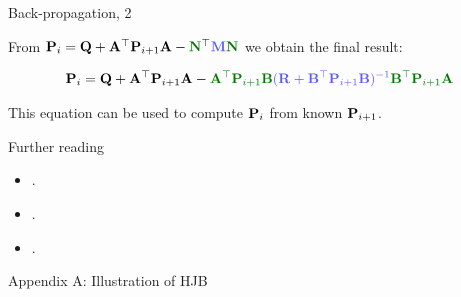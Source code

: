 \documentclass{beamer}
\begin{document}
\begin{frame}{Back-propagation, 2}
	\begin{flushleft}
		
		From $\bo{P}_i = 	\bo{Q} + \bo{A}\T \bo{P}_{i+1} \bo{A} - \textcolor{mydarkgreen}{\bo{N}}\T  \textcolor{myblue}{\bo{M}} \textcolor{mydarkgreen}{\bo{N}}  $ we obtain the final result:
		
		\begin{align*}
			\bo{P}_i = 	\bo{Q} + \bo{A}\T \bo{P}_{i+1} \bo{A} - 
			\textcolor{mydarkgreen}{\bo{A}\T\bo{P}_{i+1}\bo{B}}  \textcolor{myblue}{(\bo{R} + \bo{B}\T \bo{P}_{i+1} \bo{B})^{-1} } \textcolor{mydarkgreen}{\bo{B}\T \bo{P}_{i+1} \bo{A}}
		\end{align*}
		
		This equation can be used to compute $\mathbf{P}_i$ from known $\mathbf{P}_{i+1}$.
		
	\end{flushleft}
\end{frame}


\begin{frame}{Further reading}
	\begin{flushleft}
		
\begin{itemize}
	\item {}.
	
	\item {}.
	
	\item {}.
\end{itemize}
		
		
	\end{flushleft}
\end{frame}


\myqrframe


\begin{frame}
	\centerline{\huge Appendix A: Illustration of HJB}
\end{frame}
\end{document}
